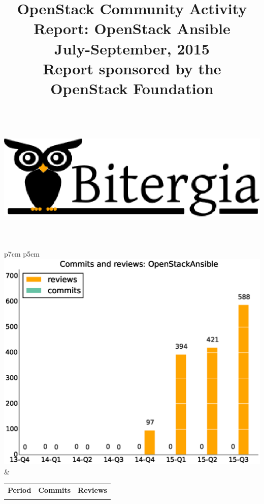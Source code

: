 \documentclass[a4wide,11pt]{article}
\begin{document}
\title{OpenStack Community Activity Report: OpenStack Ansible\\
      July-September, 2015 \\
      Report sponsored by the OpenStack Foundation\\
        ~~\\~~\\  \includegraphics[scale=.35]{logo.eps}       \\}




\maketitle

\newpage



\begin{tabular}{p{7cm} p{5cm}}
    \vspace{0pt} 
    \includegraphics[scale=.35]{figs/commitsOpenStackAnsible.eps}
    & 
    \vspace{0pt}
    \begin{tabular}{l|r|r|}%
    \bfseries Period & \bfseries Commits & \bfseries Reviews %
    \csvreader[head to column names]{data/commitsOpenStackAnsible.csv}{}%
    {\\ & \commits & \submitted}
    \end{tabular}
\end{tabular}
\end{document}
